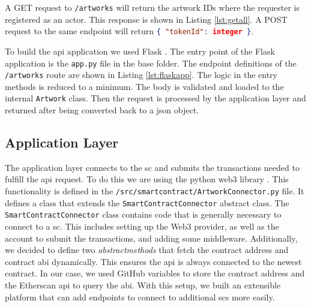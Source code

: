 

A GET request to \texttt{/artworks} will return the artwork IDs where the requester is registered as an actor. This response is shown in Listing \ref{lst:getall}. A POST request to the same endpoint will return \lstinline[language=JSON]!{ "tokenId": integer }!.



To build the \gls{api} application we used Flask \cite{flask}. The entry point of the Flask application is the \texttt{app.py} file in the base folder. The endpoint definitions of the \texttt{/artworks} route are shown in Listing \ref{lst:flaskapp}. The logic in the entry methods is reduced to a minimum. The body is validated and loaded to the internal \texttt{Artwork} class. Then the request is processed by the application layer and returned after being converted back to a \gls{json} object.




\subsection{Application Layer}
The application layer connects to the \gls{sc} and submits the transactions needed to fulfill the \gls{api} request. To do this we are using the python web3 library \cite{web3python}. This functionality is defined in the \texttt{/src/smartcontract/ArtworkConnector.py} file. It defines a class that extends the \texttt{SmartContractConnector} abstract class. The \texttt{SmartContractConnector} class contains code that is generally necessary to connect to a \gls{sc}. This includes setting up the Web3 provider, as well as the account to submit the transactions, and adding some middleware. Additionally, we decided to define two \textit{abstractmethods} that fetch the contract address and contract \gls{abi} dynamically. This ensures the \gls{api} is always connected to the newest contract. In our case, we used GitHub variables to store the contract address and the Etherscan \cite{etherscan} \gls{api} to query the \gls{abi}. With this setup, we built an extensible platform that can add endpoints to connect to additional \glspl{sc} more easily. 

